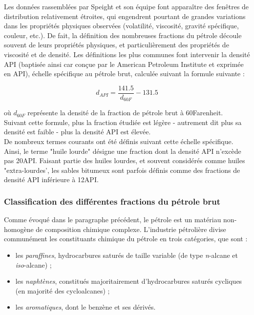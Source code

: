 Les données rassemblées par Speight et son équipe font apparaître des fenêtres de distribution relativement étroites, qui engendrent pourtant de grandes variations dans les propriétés physiques observées (volatilité, viscosité, gravité spécifique, couleur, etc.). De fait, la définition des nombreuses fractions du pétrole découle souvent de leurs propriétés physiques, et particulièrement des propriétés de viscosité et de densité. Les définitions les plus communes font intervenir la densité API (baptisée ainsi car conçue par le \og American Petroleum Institute \fg{} et exprimée en \degre API), échelle spécifique au pétrole brut, calculée suivant la formule suivante : 

\begin{equation}
d_{API}=\dfrac{141.5}{d_{60F}}-131.5
\end{equation}

où $d_{60F}$ représente la densité de la fraction de pétrole brut à 60\degre Farenheit.\\ 

Suivant cette formule, plus la fraction étudiée est légère - autrement dit plus sa densité est faible - plus la densité API est élevée.\\ 

De nombreux termes courants ont été définis suivant cette échelle spécifique. Ainsi, le terme "huile lourde" désigne une fraction dont la densité API n'excède pas 20\degre API. Faisant partie des huiles lourdes, et souvent considérés comme huiles "extra-lourdes', les sables bitumeux sont parfois définis comme des fractions de densité API inférieure à 12\degre API. 

\subsubsection{Classification des différentes fractions du pétrole brut}

Comme évoqué dans le paragraphe précédent, le pétrole est un matériau non-homogène de composition chimique complexe. L'industrie pétrolière divise communément les constituants chimique du pétrole en trois catégories, que sont : 

\begin{itemize}
	\item les \textit{paraffines}, hydrocarbures saturés de taille variable (de type \textit{n}-alcane et \textit{iso}-alcane) ;
	\item les \textit{naphtènes}, constitués majoritairement d'hydrocarbures saturés cycliques (en majorité des cycloalcanes) ;
	\item les \textit{aromatiques}, dont le benzène et ses dérivés.
\end{itemize} 

